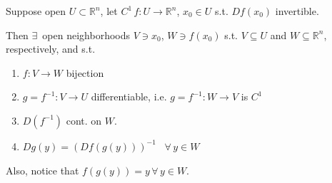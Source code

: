 \begin{theorem}
  Suppose open $U \subset \mathbb{R}^n$, let $C^1 \, f: U \to \mathbb{R}^n$, $x_0 \in U$ s.t. $Df(x_0)$ invertible.  



Then $\exists \,$ open neighborhoods $V\ni x_0$, $W \ni f(x_0)$ s.t. $V\subseteq U$ and $W\subseteq \mathbb{R}^n$, respectively, and s.t.

\begin{enumerate}
\item[(i)] $f: V\to W$ bijection
\item[(ii)] $g = f^{-1}:V \to U$ differentiable, i.e. $g = f^{-1}:W\to V$ is $C^1$
\item[(iii)] $D(f^{-1}) $ cont. on $W$.  
\item[(iv)] $Dg(y) = (Df(g(y)))^{-1}$ \, $\forall \, y \in W$
\end{enumerate}
Also, notice that $f(g(y)) = y \, \forall \, y \in W$.  
\end{theorem}

